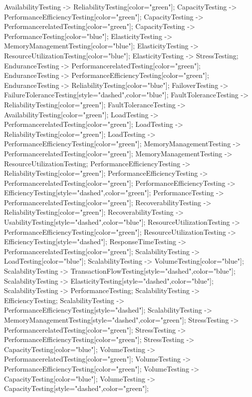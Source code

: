 \documentclass{article}
\begin{document}
{AvailabilityTesting -> ReliabilityTesting[color="green"];
CapacityTesting -> PerformanceEfficiencyTesting[color="green"];
CapacityTesting -> PerformancerelatedTesting[color="green"];
CapacityTesting -> PerformanceTesting[color="blue"];
ElasticityTesting -> MemoryManagementTesting[color="blue"];
ElasticityTesting -> ResourceUtilizationTesting[color="blue"];
ElasticityTesting -> StressTesting;
EnduranceTesting -> PerformancerelatedTesting[color="green"];
EnduranceTesting -> PerformanceEfficiencyTesting[color="green"];
EnduranceTesting -> ReliabilityTesting[color="blue"];
FailoverTesting -> FailureToleranceTesting[style="dashed",color="blue"];
FaultToleranceTesting -> ReliabilityTesting[color="green"];
FaultToleranceTesting -> AvailabilityTesting[color="green"];
LoadTesting -> PerformancerelatedTesting[color="green"];
LoadTesting -> ReliabilityTesting[color="green"];
LoadTesting -> PerformanceEfficiencyTesting[color="green"];
MemoryManagementTesting -> PerformancerelatedTesting[color="green"];
MemoryManagementTesting -> ResourceUtilizationTesting;
PerformanceEfficiencyTesting -> ReliabilityTesting[color="green"];
PerformanceEfficiencyTesting -> PerformancerelatedTesting[color="green"];
PerformanceEfficiencyTesting -> EfficiencyTesting[style="dashed",color="green"];
PerformanceTesting -> PerformancerelatedTesting[color="green"];
RecoverabilityTesting -> ReliabilityTesting[color="green"];
RecoverabilityTesting -> UsabilityTesting[style="dashed",color="blue"];
ResourceUtilizationTesting -> PerformanceEfficiencyTesting[color="green"];
ResourceUtilizationTesting -> EfficiencyTesting[style="dashed"];
ResponseTimeTesting -> PerformancerelatedTesting[color="green"];
ScalabilityTesting -> LoadTesting[color="blue"];
ScalabilityTesting -> VolumeTesting[color="blue"];
ScalabilityTesting -> TransactionFlowTesting[style="dashed",color="blue"];
ScalabilityTesting -> ElasticityTesting[style="dashed",color="blue"];
ScalabilityTesting -> PerformanceTesting;
ScalabilityTesting -> EfficiencyTesting;
ScalabilityTesting -> PerformanceEfficiencyTesting[style="dashed"];
ScalabilityTesting -> MemoryManagementTesting[style="dashed",color="green"];
StressTesting -> PerformancerelatedTesting[color="green"];
StressTesting -> PerformanceEfficiencyTesting[color="green"];
StressTesting -> CapacityTesting[color="blue"];
VolumeTesting -> PerformancerelatedTesting[color="green"];
VolumeTesting -> PerformanceEfficiencyTesting[color="green"];
VolumeTesting -> CapacityTesting[color="blue"];
VolumeTesting -> CapacityTesting[style="dashed",color="green"];

}
\end{document}
